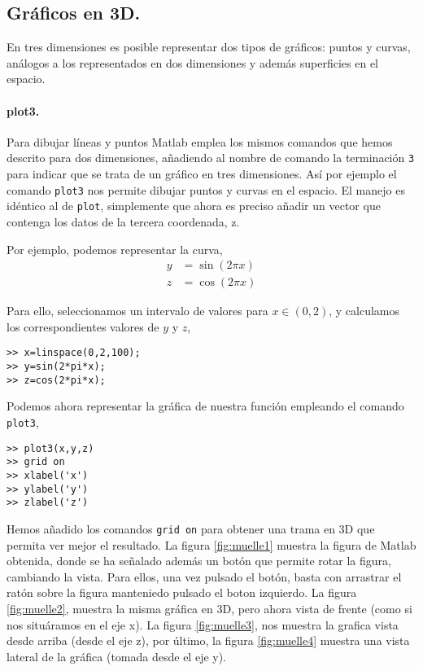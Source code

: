 \subsection{Gráficos en 3D.} En tres dimensiones es posible representar dos tipos de gráficos: puntos y curvas, análogos a los representados en dos dimensiones y además superficies en el espacio.

\paragraph{plot3.} Para dibujar líneas y puntos Matlab emplea los mismos comandos que hemos descrito para dos dimensiones, añadiendo al nombre de comando la terminación \texttt{3} para indicar que se trata de un gráfico en tres dimensiones. Así por ejemplo el comando \texttt{plot3} nos permite dibujar puntos y curvas en el espacio. El manejo es idéntico al de \texttt{plot}, simplemente que ahora es preciso añadir un vector que contenga los datos de la tercera coordenada, z. 

Por ejemplo, podemos representar la curva,
\begin{align*}
y&=\sin(2\pi x)\\
z&=\cos(2\pi x)
\end{align*}

Para ello, seleccionamos un intervalo de valores para $x \in (0,2)$, y calculamos los correspondientes valores de $y$ y $z$,

\begin{verbatim}
>> x=linspace(0,2,100);
>> y=sin(2*pi*x);
>> z=cos(2*pi*x);
\end{verbatim}

Podemos ahora representar la gráfica de nuestra función empleando el comando \texttt{plot3},
\begin{verbatim}
>> plot3(x,y,z)
>> grid on
>> xlabel('x')
>> ylabel('y')
>> zlabel('z')
\end{verbatim}

Hemos añadido los comandos \texttt{grid on}  para obtener una trama en 3D que permita ver mejor el resultado. La figura \ref{fig:muelle1} muestra la figura de Matlab obtenida, donde se ha señalado además un botón que permite rotar la figura, cambiando la vista. Para ellos, una vez pulsado el botón, basta con arrastrar el ratón sobre la figura manteniedo pulsado el boton izquierdo.  La figura \ref{fig:muelle2}, muestra la misma gráfica en 3D, pero ahora vista de frente (como si nos situáramos en el eje x). La figura \ref{fig:muelle3}, nos muestra la grafica vista desde arriba (desde el eje z), por último, la figura \ref{fig:muelle4} muestra una vista lateral de la gráfica (tomada desde el eje y).

